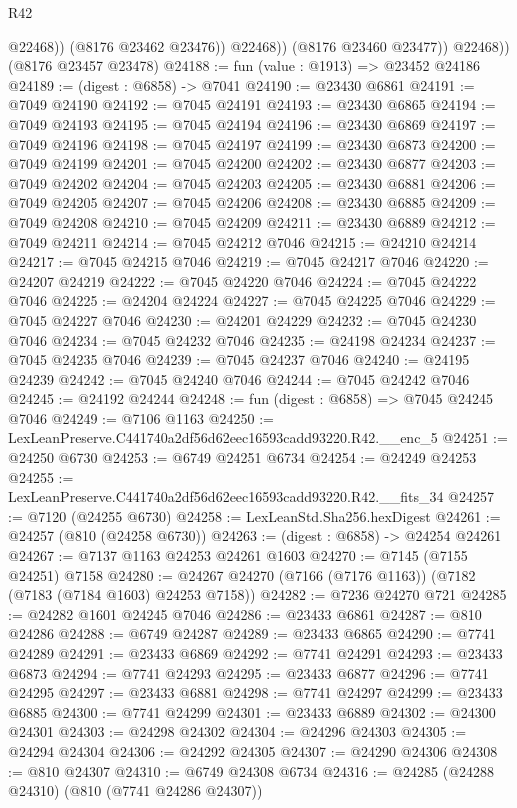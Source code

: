 \begin{lexlean}{R42}
\begin{coremodule}
{                    @22468))
                (@8176 @23462 @23476))
              @22468))
          (@8176 @23460 @23477))
        @22468))
    (@8176 @23457 @23478)
@24188 := fun (value : @1913) => @23452 @24186
@24189 := (digest : @6858) -> @7041
@24190 := @23430 @6861
@24191 := @7049 @24190
@24192 := @7045 @24191
@24193 := @23430 @6865
@24194 := @7049 @24193
@24195 := @7045 @24194
@24196 := @23430 @6869
@24197 := @7049 @24196
@24198 := @7045 @24197
@24199 := @23430 @6873
@24200 := @7049 @24199
@24201 := @7045 @24200
@24202 := @23430 @6877
@24203 := @7049 @24202
@24204 := @7045 @24203
@24205 := @23430 @6881
@24206 := @7049 @24205
@24207 := @7045 @24206
@24208 := @23430 @6885
@24209 := @7049 @24208
@24210 := @7045 @24209
@24211 := @23430 @6889
@24212 := @7049 @24211
@24214 := @7045 @24212 @7046
@24215 := @24210 @24214
@24217 := @7045 @24215 @7046
@24219 := @7045 @24217 @7046
@24220 := @24207 @24219
@24222 := @7045 @24220 @7046
@24224 := @7045 @24222 @7046
@24225 := @24204 @24224
@24227 := @7045 @24225 @7046
@24229 := @7045 @24227 @7046
@24230 := @24201 @24229
@24232 := @7045 @24230 @7046
@24234 := @7045 @24232 @7046
@24235 := @24198 @24234
@24237 := @7045 @24235 @7046
@24239 := @7045 @24237 @7046
@24240 := @24195 @24239
@24242 := @7045 @24240 @7046
@24244 := @7045 @24242 @7046
@24245 := @24192 @24244
@24248 := fun (digest : @6858) => @7045 @24245 @7046
@24249 := @7106 @1163
@24250 := LexLeanPreserve.C441740a2df56d62eec16593cadd93220.R42.__enc_5
@24251 := @24250 @6730
@24253 := @6749 @24251 @6734
@24254 := @24249 @24253
@24255 := LexLeanPreserve.C441740a2df56d62eec16593cadd93220.R42.__fits_34
@24257 := @7120 (@24255 @6730)
@24258 := LexLeanStd.Sha256.hexDigest
@24261 := @24257 (@810 (@24258 @6730))
@24263 := (digest : @6858) -> @24254 @24261
@24267 := @7137 @1163 @24253 @24261 @1603
@24270 := @7145 (@7155 @24251) @7158
@24280 := @24267 @24270 (@7166 (@7176 @1163)) (@7182 (@7183 (@7184 @1603) @24253 @7158))
@24282 := @7236 @24270 @721
@24285 := @24282 @1601 @24245 @7046
@24286 := @23433 @6861
@24287 := @810 @24286
@24288 := @6749 @24287
@24289 := @23433 @6865
@24290 := @7741 @24289
@24291 := @23433 @6869
@24292 := @7741 @24291
@24293 := @23433 @6873
@24294 := @7741 @24293
@24295 := @23433 @6877
@24296 := @7741 @24295
@24297 := @23433 @6881
@24298 := @7741 @24297
@24299 := @23433 @6885
@24300 := @7741 @24299
@24301 := @23433 @6889
@24302 := @24300 @24301
@24303 := @24298 @24302
@24304 := @24296 @24303
@24305 := @24294 @24304
@24306 := @24292 @24305
@24307 := @24290 @24306
@24308 := @810 @24307
@24310 := @6749 @24308 @6734
@24316 := @24285 (@24288 @24310) (@810 (@7741 @24286 @24307))
}
\end{coremodule}
\end{lexlean}

